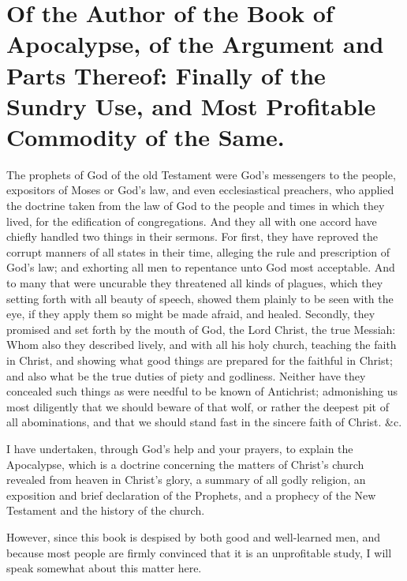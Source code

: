 \chapter[Sermon 1. Of the Author of the Book of Apocalypse, of the Argument and Parts Thereof: Finally of the Sundry Use, and Most Profitable Commodity of the Same.]{Of the Author of the Book of Apocalypse, of the Argument and Parts Thereof: Finally of the Sundry Use, and Most Profitable Commodity of the Same.}
\label{sermon:001}

The prophets of God of the old Testament were God’s messengers to the people, expositors of Moses or God’s law, and even ecclesiastical preachers, who applied the doctrine taken from the law of God to the people and times in which they lived, for the edification of congregations. And they all with one accord have chiefly handled two things in their sermons. For first, they have reproved the corrupt manners of all states in their time, alleging the rule and prescription of God’s law; and exhorting all men to repentance unto God most acceptable. And to many that were uncurable they threatened all kinds of plagues, which they setting forth with all beauty of speech, showed them plainly to be seen with the eye, if they apply them so might be made afraid, and healed. Secondly, they promised and set forth by the mouth of God, the Lord Christ, the true Messiah: Whom also they described lively, and with all his holy church, teaching the faith in Christ, and showing what good things are prepared for the faithful in Christ; and also what be the true duties of piety and godliness. Neither have they concealed such things as were needful to be known of Antichrist; admonishing us most diligently that we should beware of that wolf, or rather the deepest pit of all abominations, and that we should stand fast in the sincere faith of Christ. \&c.

I have undertaken, through God’s help and your prayers, to explain the Apocalypse, which is a doctrine concerning the matters of Christ’s church revealed from heaven in Christ’s glory, a summary of all godly religion, an exposition and brief declaration of the Prophets, and a prophecy of the New Testament and the history of the church.

However, since this book is despised by both good and well-learned men, and because most people are firmly convinced that it is an unprofitable study, I will speak somewhat about this matter here.


